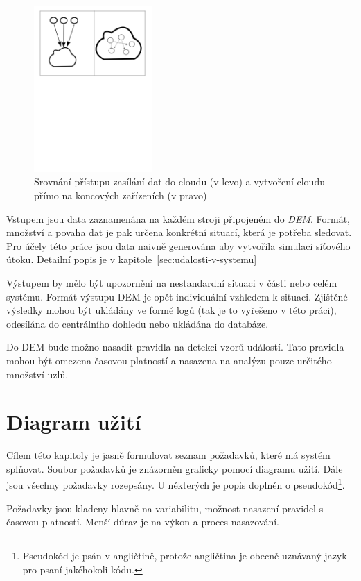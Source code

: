 \documentclass[
  digital, %
  table,   %
  nolof,     %
  nolot,     %
  oneside, %
  nocover,
  monochrome,
  12pt
]{fithesis3}
\begin{document}
\begin{figure}[H]
	\centering
    \includegraphics[width=0.4\textwidth, height=0.35\textheight]{images/cloud-comparison.png}
    \caption{Srovnání přístupu zasílání dat do cloudu (v levo) a vytvoření cloudu přímo na koncových zařízeních (v pravo)}
    \label{fig:cloud-comparison}
\end{figure}

Vstupem jsou data zaznamenána na každém stroji připojeném do \textit{DEM}. Formát, množství a povaha dat je pak určena konkrétní situací, která je potřeba sledovat. Pro účely této práce jsou data naivně generována aby vytvořila simulaci síťového útoku. Detailní popis je v kapitole~\ref{sec:udalosti-v-systemu}

Výstupem by mělo být upozornění na nestandardní situaci v části nebo celém systému. Formát výstupu DEM je opět individuální vzhledem k situaci. Zjištěné výsledky mohou být ukládány ve formě logů (tak je to vyřešeno v této práci), odesílána do centrálního dohledu nebo ukládána do databáze.

Do DEM bude možno nasadit pravidla na detekci vzorů událostí. Tato pravidla mohou být omezena časovou platností a nasazena na analýzu pouze určitého množství uzlů.

\section{Diagram užití}
Cílem této kapitoly je jasně formulovat seznam požadavků, které má systém splňovat. Soubor požadavků je znázorněn graficky pomocí diagramu užití. Dále jsou všechny požadavky rozepsány. U některých je popis doplněn o pseudokód\footnote{Pseudokód je psán v angličtině, protože angličtina je obecně uznávaný jazyk pro psaní jakéhokoli kódu.}.

Požadavky jsou kladeny hlavně na variabilitu, možnost nasazení pravidel s časovou platností. Menší důraz je na výkon a proces nasazování.
\end{document}
